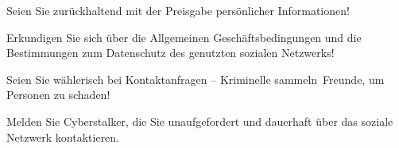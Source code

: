 \item Seien Sie zurückhaltend mit der Preisgabe persönlicher Informationen!
\item Erkundigen Sie sich über die Allgemeinen Geschäftsbedingungen und die Bestimmungen zum Datenschutz des genutzten sozialen Netzwerks!
\item Seien Sie wählerisch bei Kontaktanfragen -- Kriminelle \glqq sammeln\grqq\ Freunde, um Personen zu schaden!
\item Melden Sie \glqq Cyberstalker\grqq, die Sie unaufgefordert und dauerhaft über das soziale Netzwerk kontaktieren.